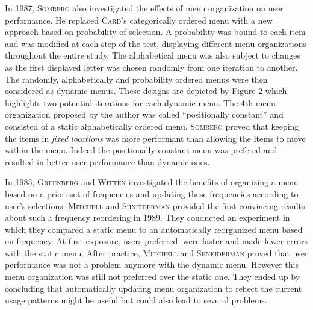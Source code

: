 \begin{figure}[!ht]
    
    \label{fig:card_menus}
\end{figure}

In 1987, \textsc{Somberg} \cite{somberg} also investigated the effects of menu 
organization on user performance. He replaced \textsc{Card}’s categorically 
ordered menu 
with a new approach based on probability of selection. A probability was bound 
to each item and was modified at each step of the test, displaying different 
menu organizations throughout the entire study. The alphabetical menu was also 
subject to changes as the first displayed letter was chosen randomly from one 
iteration to another. The randomly, alphabetically and probability ordered 
menus were then considered as dynamic menus. These designs are depicted by 
Figure \ref{fig:somberg_menus} which highlights two potential iterations for 
each dynamic menu. The 4th menu organization proposed by the author was called 
\enquote{positionally constant} and consisted of a static alphabetically 
ordered menu. \textsc{Somberg} proved that keeping the items in \textit{fixed 
locations} was more 
performant than allowing the items to move within the menu. Indeed the 
positionally constant menu was prefered and resulted in better user performance 
than dynamic ones.\newline

\begin{figure}[!ht]
    
    \label{fig:somberg_menus}
\end{figure}

In 1985, \textsc{Greenberg} and \textsc{Witten} \cite{greenberg_witten} 
investigated the benefits 
of organizing a menu based on a-priori set of frequencies and updating these 
frequencies according to user’s selections. \textsc{Mitchell} and 
\textsc{Shneiderman} 
\cite{mitchell_shneiderman} provided the first convincing results about such a 
frequency reordering in 1989. They conducted an experiment in which they 
compared a static menu to an automatically reorganized menu based on frequency. 
At first exposure, users preferred, were faster and made fewer errors with the 
static menu. After practice, \textsc{Mitchell} and \textsc{Shneiderman} proved 
that user 
performance was not a problem anymore with the dynamic menu. However this menu 
organization was still not preferred over the static one. They ended up by 
concluding that automatically updating menu organization to reflect the current 
usage patterns might be useful but could also lead to several problems.

